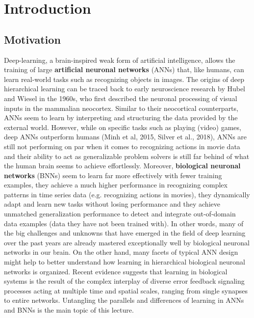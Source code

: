 \documentclass[main]{subfiles}
\begin{document}
\section{Introduction}

\subsection{Motivation}
Deep-learning, a brain-inspired weak form of artificial intelligence, allows the training of large \textbf{artificial neuronal networks} (ANNs) that, like humans, can learn real-world tasks such as recognizing objects in images. The origins of deep hierarchical learning can be traced back to early neuroscience research by Hubel and Wiesel in the 1960s, who first described the neuronal processing of visual inputs in the mammalian neocortex. Similar to their neocortical counterparts, ANNs seem to learn by interpreting and structuring the data provided by the external world. However, while on specific tasks such as playing (video) games, deep ANNs outperform humans (Minh et al, 2015, Silver et al., 2018), ANNs are still not performing on par when it comes to recognizing actions in movie data and their ability to act as generalizable problem solvers is still far behind of what the human brain seems to achieve effortlessly. Moreover, \textbf{biological neuronal networks} (BNNs) seem to learn far more effectively with fewer training examples, they achieve a much higher performance in recognizing complex patterns in time series data (e.g. recognizing actions in movies), they dynamically adapt and learn new tasks without losing performance and they achieve unmatched generalization performance to detect and integrate out-of-domain data examples (data they have not been trained with). In other words, many of the big challenges and unknowns that have emerged in the field of deep learning over the past years are already mastered exceptionally well by biological neuronal networks in our brain. On the other hand, many facets of typical ANN design might help to better understand how learning in hierarchical biological neuronal networks is organized. Recent evidence suggests that learning in biological systems is the result of the complex interplay of diverse error feedback signaling processes acting at multiple time and spatial scales, ranging from single synapses to entire networks. Untangling the parallels and differences of learning in ANNs and BNNs is the main topic of this lecture.
%
\end{document}
